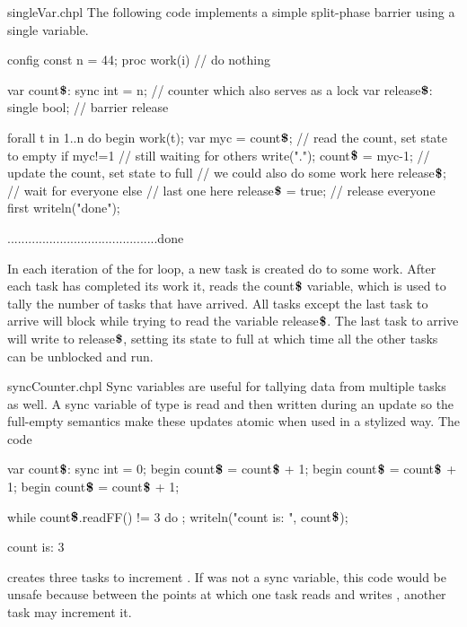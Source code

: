 \begin{chapelexample}{singleVar.chpl}
The following code implements a simple split-phase barrier using a
single variable.
\begin{chapelpre}
config const n = 44;
proc work(i) {
  // do nothing
}
\end{chapelpre}
\begin{chapel}
var count$\mbox{{\bf \$}}$: sync int = n;  // counter which also serves as a lock
var release$\mbox{{\bf \$}}$: single bool; // barrier release

forall t in 1..n do begin {
  work(t);
  var myc = count$\mbox{{\bf \$}}$;  // read the count, set state to empty
  if myc!=1 {         // still waiting for others
    write(".");
    count$\mbox{{\bf \$}}$ = myc-1;  // update the count, set state to full
    // we could also do some work here
    release$\mbox{{\bf \$}}$;         // wait for everyone
  } else {            // last one here
    release$\mbox{{\bf \$}}$ = true;  // release everyone first
    writeln("done");
  }
}
\end{chapel}
\begin{chapeloutput}
...........................................done
\end{chapeloutput}
In each iteration of the for loop, a new task is created do to some
work.  After each task has completed its work it, reads the
count$\mbox{{\bf \$}}$ variable, which is used to tally the number of
tasks that have arrived.  All tasks except the last task to arrive
will block while trying to read the variable
release$\mbox{{\bf \$}}$.  The last task to arrive will write to
release$\mbox{{\bf \$}}$, setting its state to full at which time all
the other tasks can be unblocked and run.
\end{chapelexample}

\begin{chapelexample}{syncCounter.chpl}
Sync variables are useful for tallying data from multiple tasks as
well.  A sync variable of type  is read and then written
during an update so the full-empty semantics make these updates atomic
when used in a stylized way.  The code
\begin{chapel}
var count$\mbox{{\bf \$}}$: sync int = 0;
begin count$\mbox{{\bf \$}}$ = count$\mbox{{\bf \$}}$ + 1;
begin count$\mbox{{\bf \$}}$ = count$\mbox{{\bf \$}}$ + 1;
begin count$\mbox{{\bf \$}}$ = count$\mbox{{\bf \$}}$ + 1;
\end{chapel}
\begin{chapelpost}
while count$\mbox{{\bf \$}}$.readFF() != 3 do ;
writeln("count is: ", count$\mbox{{\bf \$}}$);
\end{chapelpost}
\begin{chapeloutput}
count is: 3
\end{chapeloutput}
creates three tasks to increment .
If  was not a sync variable, this code
would be unsafe because between the points at which one task
reads  and
writes , another task may increment it.
\end{chapelexample}


